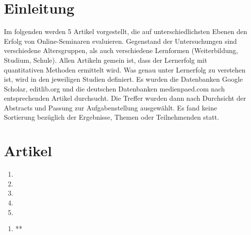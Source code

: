 \section{Einleitung}\label{einleitung}

Im folgenden werden 5 Artikel vorgestellt, die auf unterschiedlichsten
Ebenen den Erfolg von Online-Seminaren evaluieren. Gegenstand der
Untersuchungen sind verschiedene Altersgruppen, als auch verschiedene
Lernformen (Weiterbildung, Studium, Schule). Allen Artikeln gemein ist,
dass der Lernerfolg mit quantitativen Methoden ermittelt wird. Was genau
unter Lernerfolg zu verstehen ist, wird in den jeweiligen Studien
definiert. Es wurden die Datenbanken Google Scholar, editlib.org und die
deutschen Datenbanken medienpaed.com nach entsprechenden Artikel
durchsucht. Die Treffer wurden dann nach Durchsicht der Abstracts und
Passung zur Aufgabenstellung ausgewählt. Es fand keine Sortierung
bezüglich der Ergebnisse, Themen oder Teilnehmenden statt.

\section{Artikel}\label{artikel}

\begin{enumerate}
\def\labelenumi{\arabic{enumi}.}
\item
\item
\item
\item
\item
\end{enumerate}

\pagebreak

\begin{enumerate}
\def\labelenumi{\arabic{enumi}.}
\itemsep1pt\parskip0pt
\item
  **
\end{enumerate}

